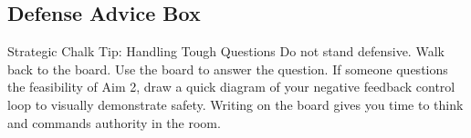 \subsection{Defense Advice Box}
\begin{infobox}{Strategic Chalk Tip: Handling Tough Questions}
Do not stand defensive. Walk back to the board. Use the board to answer the question. If someone questions the feasibility of Aim 2, draw a quick diagram of your negative feedback control loop to visually demonstrate safety. Writing on the board gives you time to think and commands authority in the room.
\end{infobox}
